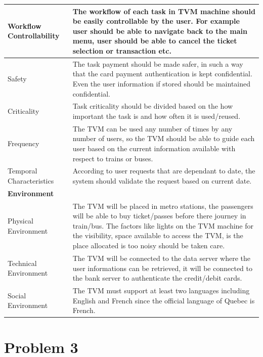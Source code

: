 \documentclass[a4paper,12pt]{report}
\begin{document}
\setlength{\tabcolsep}{18pt}
\renewcommand{\arraystretch}{1.5}
\begin{tabular}{ |p{3cm}|p{12cm}| }
	\hline
	Workflow Controllability & The workflow of each task in TVM machine should be easily controllable by the user. For example user should be able to navigate back to the main menu, user should be able to cancel the ticket selection or transaction etc.\\
	\hline
	Safety & 
	The task payment should be made safer, in such a way that the card payment authentication is kept confidential. Even the user information if stored should be maintained confidential.\\
	\hline
	Criticality & 
	Task criticality should be divided based on the how important the task is and how often it is used/reused.\\
	\hline
	Frequency & 
	The TVM can be used any number of times by any number of users, so the TVM should be able to guide each user based on the current information available with respect to trains or buses.\\
	\hline
	Temporal Characteristics & 
	According to user requests that are dependant to date, the system should validate the request based on current date. \\
	
	\hline
	\textbf{Environment} & \\
	\hline
	Physical Environment & 
	The TVM will be placed in metro stations, the passengers will be able to buy ticket/passes before there journey in train/bus. The factors like lights on the TVM machine for the visibility, space available to access the TVM, is the place allocated is too noisy should be taken care. \\
	\hline
	Technical Environment & 
	The TVM will be connected to the data server where the user informations can be retrieved, it will be connected to the bank server to authenticate the credit/debit cards. \\
	\hline
	Social Environment & 
	The TVM must support at least two languages including English and French since the official language of Quebec is French. \\
	\hline
\end{tabular}





\newpage
\section{Problem 3}
\end{document}
